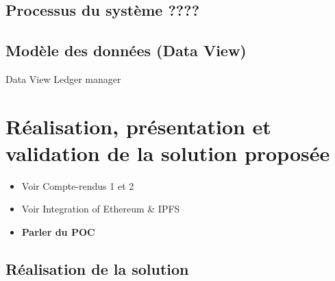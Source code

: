 \documentclass{tnreport}
\begin{document}
\section{Processus du système ????}

\section{Modèle des données (Data View)}

Data View
Ledger manager

\chapter{Réalisation, présentation et validation de la solution proposée}
\label{sec:realisation}

\begin{itemize}
	\item Voir Compte-rendus 1 et 2
	\item Voir Integration of Ethereum \& IPFS
	\item \textbf{Parler du POC}
\end{itemize}

\section{Réalisation de la solution}
\end{document}
